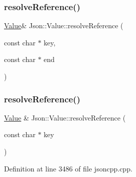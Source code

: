 \hypertarget{class_json_1_1_value_a121c76136ac3255ad3de088b50652acb}{}\label{class_json_1_1_value_a121c76136ac3255ad3de088b50652acb} 
\subsubsection{\texorpdfstring{resolve\+Reference()}{resolveReference()}\hspace{0.1cm}{\footnotesize\ttfamily [2/4]}}
{\footnotesize\ttfamily \hyperlink{class_json_1_1_value}{Value}\& Json\+::\+Value\+::resolve\+Reference (\begin{DoxyParamCaption}\item[{const char $\ast$}]{key,  }\item[{const char $\ast$}]{end }\end{DoxyParamCaption})\hspace{0.3cm}{\ttfamily [private]}}

\hypertarget{class_json_1_1_value_a9ff9cdae2c8f4155bab603d750b0b3f1}{}\label{class_json_1_1_value_a9ff9cdae2c8f4155bab603d750b0b3f1} 
\subsubsection{\texorpdfstring{resolve\+Reference()}{resolveReference()}\hspace{0.1cm}{\footnotesize\ttfamily [3/4]}}
{\footnotesize\ttfamily \hyperlink{class_json_1_1_value}{Value} \& Json\+::\+Value\+::resolve\+Reference (\begin{DoxyParamCaption}\item[{const char $\ast$}]{key }\end{DoxyParamCaption})\hspace{0.3cm}{\ttfamily [private]}}



Definition at line 3486 of file jsoncpp.\+cpp.

\hypertarget{class_json_1_1_value_a5f6b3aaf4f2e952a33dd823db008c333}{}\label{class_json_1_1_value_a5f6b3aaf4f2e952a33dd823db008c333} 
